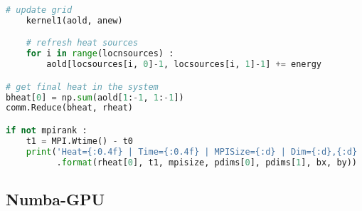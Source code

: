 \begin{lstlisting}[language=Python, caption={Parallel Numba-CPU implementation of the stencil test case.}]
    # update grid
    kernel1(aold, anew)

    # refresh heat sources
    for i in range(locnsources) :
        aold[locsources[i, 0]-1, locsources[i, 1]-1] += energy 

# get final heat in the system
bheat[0] = np.sum(aold[1:-1, 1:-1])
comm.Reduce(bheat, rheat)

if not mpirank :
    t1 = MPI.Wtime() - t0
    print('Heat={:0.4f} | Time={:0.4f} | MPISize={:d} | Dim={:d},{:d} | bx,by={:d},{:d}'
          .format(rheat[0], t1, mpisize, pdims[0], pdims[1], bx, by))
\end{lstlisting}




\subsection{Numba-GPU}
